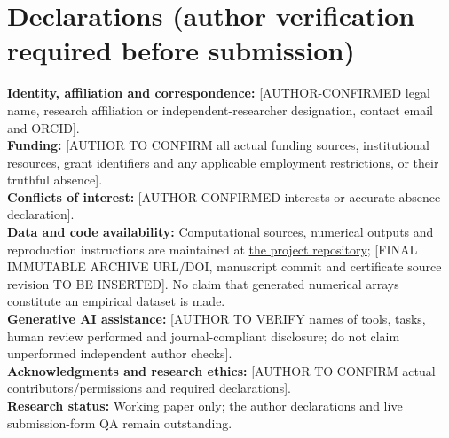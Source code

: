 \documentclass[11pt,a4paper]{article}
\theoremstyle{remark}\newtheorem{remark}[theorem]{Remark}
\begin{document}
\section*{Declarations (author verification required before submission)}
\noindent\textbf{Identity, affiliation and correspondence:} [AUTHOR-CONFIRMED legal name, research affiliation or independent-researcher designation, contact email and ORCID].\\
\textbf{Funding:} [AUTHOR TO CONFIRM all actual funding sources, institutional resources, grant identifiers and any applicable employment restrictions, or their truthful absence].\\
\textbf{Conflicts of interest:} [AUTHOR-CONFIRMED interests or accurate absence declaration].\\
\textbf{Data and code availability:} Computational sources, numerical outputs and reproduction instructions are maintained at \href{https://github.com/ryotamatsuki/standards-coalitions-differentiation-cournot}{the project repository}; [FINAL IMMUTABLE ARCHIVE URL/DOI, manuscript commit and certificate source revision TO BE INSERTED]. No claim that generated numerical arrays constitute an empirical dataset is made.\\
\textbf{Generative AI assistance:} [AUTHOR TO VERIFY names of tools, tasks, human review performed and journal-compliant disclosure; do not claim unperformed independent author checks].\\
\textbf{Acknowledgments and research ethics:} [AUTHOR TO CONFIRM actual contributors/permissions and required declarations].\\
\textbf{Research status:} Working paper only; the author declarations and live submission-form QA remain outstanding.
\end{document}
